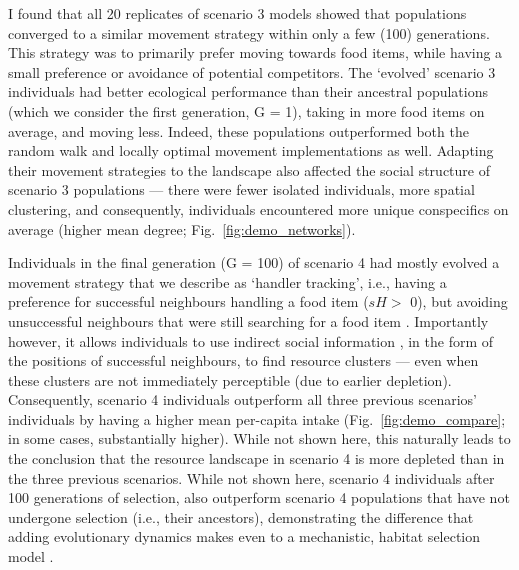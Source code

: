 \begin{interludeenv}
I found that all 20 replicates of scenario 3 models showed that populations converged to a similar movement strategy within only a few (100) generations.
This strategy was to primarily prefer moving towards food items, while having a small preference or avoidance of potential competitors.
The `evolved' scenario 3 individuals had better ecological performance than their ancestral populations (which we consider the first generation, G = 1), taking in more food items on average, and moving less.
Indeed, these populations outperformed both the random walk and locally optimal movement implementations as well.
Adapting their movement strategies to the landscape also affected the social structure of scenario 3 populations --- there were fewer isolated individuals, more spatial clustering, and consequently, individuals encountered more unique conspecifics on average (higher mean degree; Fig.~\ref{fig:demo_networks}).

Individuals in the final generation (G = 100) of scenario 4 had mostly evolved a movement strategy that we describe as `handler tracking', i.e., having a preference for successful neighbours handling a food item ($sH >$ 0), but avoiding unsuccessful neighbours that were still searching for a food item \citep[$sN <$ 0;][]{gupte2021a,gupte2022c}.
Importantly however, it allows individuals to use indirect social information \citep{dall2005,spiegel2016a}, in the form of the positions of successful neighbours, to find resource clusters --- even when these clusters are not immediately perceptible (due to earlier depletion).
Consequently, scenario 4 individuals outperform all three previous scenarios' individuals by having a higher mean per-capita intake (Fig.~\ref{fig:demo_compare}; in some cases, substantially higher).
While not shown here, this naturally leads to the conclusion that the resource landscape in scenario 4 is more depleted than in the three previous scenarios.
While not shown here, scenario 4 individuals after 100 generations of selection, also outperform scenario 4 populations that have not undergone selection (i.e., their ancestors), demonstrating the difference that adding evolutionary dynamics makes even to a mechanistic, habitat selection model \citep[such as][]{white2018}.


\end{interludeenv}
